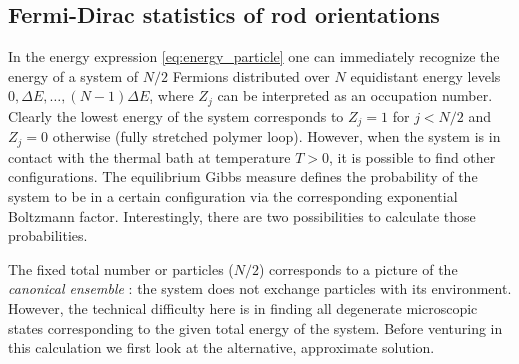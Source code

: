 \documentclass[aps,showpacs,twocolumn,floatfix,prx,superscriptaddress]{revtex4-1}
\begin{document}
\subsection{Fermi-Dirac statistics of rod orientations}
In the energy expression \eqref{eq:energy_particle} one can immediately
recognize the energy of a system of $N/2$ Fermions distributed over $N$
equidistant energy levels $0, \Delta E, \ldots, (N-1) \Delta E$, where $Z_j$ can
be interpreted as an occupation number. Clearly the lowest energy of the system
corresponds to $Z_j = 1$ for $j < N/2$ and $Z_j=0$ otherwise (fully stretched
polymer loop). However, when the system is in contact with the thermal bath at
temperature $T>0$, it is possible to find other configurations. The equilibrium
Gibbs measure defines the probability of the system to be in a certain
configuration via the corresponding exponential Boltzmann factor.
Interestingly, there are two possibilities to calculate those probabilities. 


The fixed total number or particles ($N/2$) corresponds to a picture of the
\emph{canonical ensemble} \cite{Chandler1987,Huang2001}: the system does not
exchange particles with its environment. However, the technical difficulty here
is in finding all degenerate microscopic states corresponding to the given total
energy of the system. Before venturing in this calculation we first look at the
alternative, approximate solution.

\end{document}
